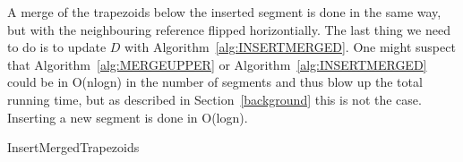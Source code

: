 A merge of the trapezoids below the inserted segment is done in the same way, but with the neighbouring reference flipped horizontially. The last thing we need to do is to update $D$ with Algorithm~\ref{alg:INSERTMERGED}. One might suspect that Algorithm~\ref{alg:MERGEUPPER} or Algorithm~\ref{alg:INSERTMERGED} could be in O(nlogn) in the number of segments and thus blow up the total running time, but as described in Section~\ref{background} this is not the case. Inserting a new segment is done in O(logn). 

\IncMargin{1em}
\begin{algorithm}[]
\label{alg:INSERTMERGED}
\caption{InsertMergedTrapezoids}
\end{algorithm}\DecMargin{1em}


